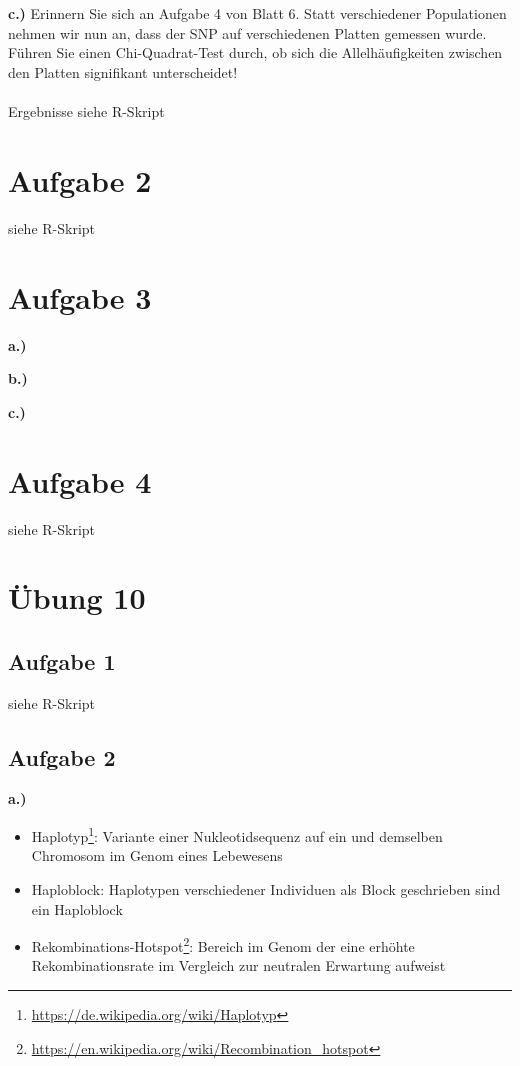 \documentclass[13pt,a4paper]{article}
\begin{document}
\\\\
\textbf{c.)} Erinnern Sie sich an Aufgabe 4 von Blatt 6. Statt verschiedener Populationen nehmen wir nun an, dass der SNP auf verschiedenen Platten gemessen wurde. Führen Sie einen Chi-Quadrat-Test durch, ob sich die Allelhäufigkeiten zwischen den Platten signifikant unterscheidet!\\\\
Ergebnisse siehe R-Skript

\section{Aufgabe 2}
siehe R-Skript

\section{Aufgabe 3}
\textbf{a.)}

\textbf{b.)}

\textbf{c.)}

\section{Aufgabe 4}
siehe R-Skript

\newpage
\section{Übung 10}
\subsection{Aufgabe 1}
siehe R-Skript

\subsection{Aufgabe 2}
\textbf{a.)}
\begin{itemize}
	\item Haplotyp\footnote{\url{https://de.wikipedia.org/wiki/Haplotyp}}: Variante einer Nukleotidsequenz auf ein und demselben Chromosom im Genom eines Lebewesens
	\item Haploblock: Haplotypen verschiedener Individuen als Block geschrieben sind ein Haploblock
	\item Rekombinations-Hotspot\footnote{\url{https://en.wikipedia.org/wiki/Recombination_hotspot}}: Bereich im Genom der eine erhöhte Rekombinationsrate im Vergleich zur neutralen Erwartung aufweist
\end{itemize}
\end{document}
